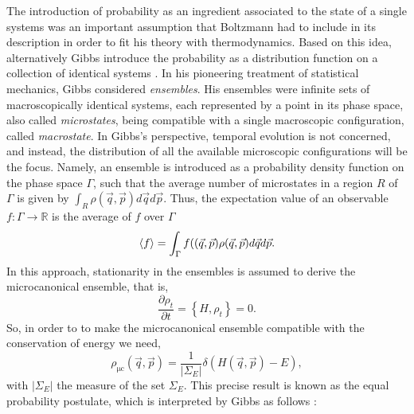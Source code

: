 The introduction of probability as an ingredient associated to the state of a single systems was an important assumption that Boltzmann had to include in its description in order to fit his theory with thermodynamics. Based on this idea, alternatively Gibbs introduce the probability as a distribution function on a collection of identical systems \cite{gibbs_elementary_1902}. In his pioneering treatment of statistical mechanics, Gibbs considered \textit{ensembles}. His ensembles were infinite sets of macroscopically identical systems, each represented by a point in its phase space, also called \textit{microstates}, being compatible with a single macroscopic configuration, called \textit{macrostate}. In Gibbs's perspective, temporal evolution is not concerned, and instead, the distribution of all the available microscopic configurations will be the focus. Namely, an ensemble is introduced as a probability density function on the phase space $\Gamma$, such that the average number of microstates in a region $R$ of $\Gamma$ is given by $\int_{R}\rho(\vec{q},\vec{p}) d\vec{q}d\vec{p}$. Thus, the expectation value of an observable $f:\Gamma\rightarrow\mathbb{R}$ is the average of $f$ over $\Gamma$
\begin{equation}
\mathinner{\langle{f}\rangle} = \int_{\Gamma} f((\vec{q},\vec{p})\rho(\vec{q},\vec{p})d\vec{q}d\vec{p}.
\label{CH1:Average_ensemble}
\end{equation}
In this approach, stationarity in the ensembles is assumed to derive the microcanonical ensemble, that is,
\begin{equation}
\frac{\partial \rho_{t}}{\partial t}=\left\{H, \rho_{t}\right\} = 0.
\end{equation}
\indent So, in order to to make the microcanonical ensemble compatible with the conservation of energy we need,
\begin{equation}
\rho_{\mathrm{\mu c}}(\vec{q},\vec{p})=\frac{1}{\left|\Sigma_{E}\right|} \delta(H(\vec{q},\vec{p})-E),
\label{CH1:Microcanonical_ensemble}
\end{equation}
with $|\Sigma_E|$ the measure of the set $\Sigma_E$. This precise result is known as the equal probability postulate, which is interpreted by Gibbs as follows \cite{gibbs_elementary_1902}:

